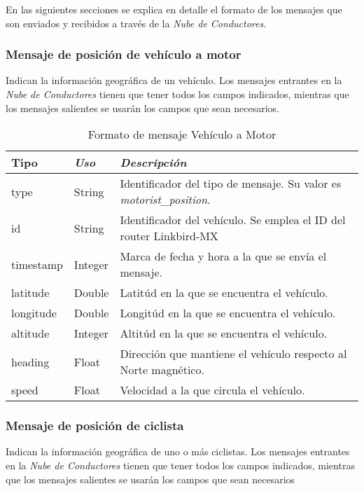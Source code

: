 En las siguientes secciones se explica en detalle el formato de los mensajes que son enviados y recibidos a través de la \emph{Nube de Conductores}.

\subsubsection{Mensaje de posición de vehículo a motor}\label{sssection:MensajePosVehMotor}
Indican la información geográfica de un vehículo. Los mensajes entrantes en la \emph{Nube de Conductores} tienen que tener todos los campos indicados, mientras que los mensajes salientes se usarán los campos que sean necesarios.

\begin{table}[H]
	\centering
	\caption{Formato de mensaje Vehículo a Motor}\label{tab:CamposMensajePosVehMotNubeConductores}
	\begin{tabular}{lll}
		\toprule
			\textbf{Tipo} & \emph{Uso} & \emph{Descripción}\\
		\midrule
			type		&	String	&	Identificador del tipo de mensaje. Su valor es \emph{motorist\_position}.	\\
			id		&	String	&	Identificador del vehículo. Se emplea el ID del router Linkbird-MX		\\
			timestamp	&	Integer	&	Marca de fecha y hora a la que se envía el mensaje.					\\
			latitude	&	Double	&	Latitúd en la que se encuentra el vehículo. 						\\
			longitude	&	Double	&	Longitúd en la que se encuentra el vehículo.						\\
			altitude	&	Integer	&	Altitúd en la que se encuentra el vehículo.						\\
			heading	&	Float		&	Dirección que mantiene el vehículo respecto al Norte magnético.		\\
			speed	&	Float		&	Velocidad a la que circula el vehículo.							\\					 
		\bottomrule
	\end{tabular}
\end{table}

\subsubsection{Mensaje de posición de ciclista}\label{sssection:MensajePosCiclista}
Indican la información geográfica de uno o más ciclistas. Los mensajes entrantes en la \emph{Nube de Conductores} tienen que tener todos los campos indicados, mientras que los mensajes salientes se usarán los campos que sean necesarios

